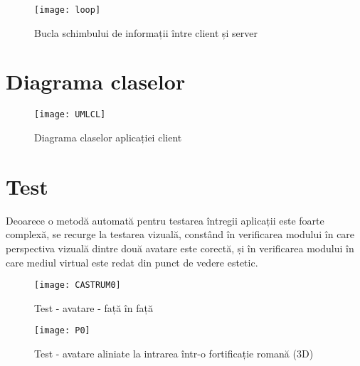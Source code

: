 \begin{figure}[h]
    \centering
    \texttt{[image: loop]}
    \caption{Bucla schimbului de informații între client și server}
    \label{fig:loop}
\end{figure}


\section{Diagrama claselor}
\begin{figure}[h]
    \centering
    \texttt{[image: UMLCL]}
    \caption{Diagrama claselor aplicației client}
    \label{fig:loop}
\end{figure}

\section{Test}
\par Deoarece o metodă automată pentru testarea întregii aplicații este foarte complexă, se recurge la testarea vizuală, constând în verificarea modului în care perspectiva vizuală dintre două avatare este corectă, și în verificarea modului în care mediul virtual este redat din punct de vedere estetic.
\begin{figure}[ht]
    \centering
    \texttt{[image: CASTRUM0]}
    \caption{Test - avatare - față în față }
    \label{fig:loop}
\end{figure}
\begin{figure}[ht]
    \centering
    \texttt{[image: P0]}
    \caption{Test - avatare aliniate la intrarea într-o fortificație romană (3D)}
    \label{fig:loop}
\end{figure}